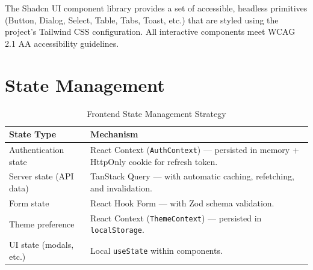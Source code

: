 The Shadcn UI component library provides a set of accessible, headless primitives (Button, Dialog, Select, Table, Tabs, Toast, etc.) that are styled using the project's Tailwind CSS configuration. All interactive components meet WCAG 2.1 AA accessibility guidelines.

\section{State Management}

\begin{table}[H]
\centering
\caption{Frontend State Management Strategy}
\begin{tabularx}{\textwidth}{lX}
\toprule
\textbf{State Type} & \textbf{Mechanism} \\
\midrule
Authentication state  & React Context (\texttt{AuthContext}) --- persisted in memory + HttpOnly cookie for refresh token. \\
Server state (API data) & TanStack Query --- with automatic caching, refetching, and invalidation. \\
Form state            & React Hook Form --- with Zod schema validation. \\
Theme preference      & React Context (\texttt{ThemeContext}) --- persisted in \texttt{localStorage}. \\
UI state (modals, etc.) & Local \texttt{useState} within components. \\
\bottomrule
\end{tabularx}
\end{table}
